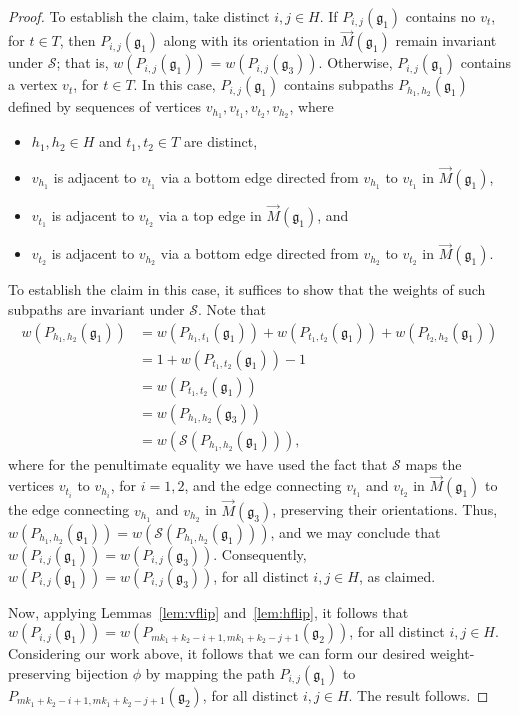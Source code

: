 \documentclass[letterpaper,10pt]{article}
\begin{document}
\begin{proof}
To establish the claim, take distinct $i,j\in H$. 
If $P_{i,j}(\mathfrak{g}_1)$ contains no $v_{t}$, for $t\in T$, then $P_{i,j}(\mathfrak{g}_1)$ along with its orientation in $\overrightarrow{M}(\mathfrak{g}_1)$ remain invariant under $\mathcal{S}$; that is, $w(P_{i,j}(\mathfrak{g}_1))=w(P_{i,j}(\mathfrak{g}_3))$. Otherwise, $P_{i,j}(\mathfrak{g}_1)$ contains a vertex $v_{t}$, for $t\in T$. In this case, $P_{i,j}(\mathfrak{g}_1)$ contains subpaths $P_{h_1,h_2}(\mathfrak{g}_1)$ defined by sequences of vertices $v_{h_1},v_{t_1},v_{t_2},v_{h_2}$, where
\begin{itemize}
    \item $h_1,h_2\in H$ and $t_1,t_2\in T$ are distinct,
    \item $v_{h_1}$ is adjacent to $v_{t_1}$ via a bottom edge directed from $v_{h_1}$ to $v_{t_1}$ in $\overrightarrow{M}(\mathfrak{g}_1)$,
    \item $v_{t_1}$ is adjacent to $v_{t_2}$ via a top edge in $\overrightarrow{M}(\mathfrak{g}_1)$, and
    \item $v_{t_2}$ is adjacent to $v_{h_2}$ via a bottom edge directed from $v_{h_2}$ to $v_{t_2}$ in $\overrightarrow{M}(\mathfrak{g}_1)$.
\end{itemize}
To establish the claim in this case, it suffices to show that the weights of such subpaths are invariant under $\mathcal{S}$. Note that
\begin{align*}
    w(P_{h_1,h_2}(\mathfrak{g}_1))&=w(P_{h_1,t_1}(\mathfrak{g}_1))+w(P_{t_1,t_2}(\mathfrak{g}_1))+w(P_{t_2,h_2}(\mathfrak{g}_1))\\
    &=1+w(P_{t_1,t_2}(\mathfrak{g}_1))-1\\
    &=w(P_{t_1,t_2}(\mathfrak{g}_1))\\
    &=w(P_{h_1,h_2}(\mathfrak{g}_3))\\
    &=w(\mathcal{S}(P_{h_1,h_2}(\mathfrak{g}_1))),
\end{align*}
where for the penultimate equality we have used the fact that $\mathcal{S}$ maps the vertices $v_{t_i}$ to $v_{h_i}$, for $i=1,2$, and the edge connecting $v_{t_1}$ and $v_{t_2}$ in $\overrightarrow{M}(\mathfrak{g}_1)$ to the edge connecting $v_{h_1}$ and $v_{h_2}$ in $\overrightarrow{M}(\mathfrak{g}_3)$, preserving their orientations. Thus, $w(P_{h_1,h_2}(\mathfrak{g}_1))=w(\mathcal{S}(P_{h_1,h_2}(\mathfrak{g}_1)))$, and we may conclude that $w(P_{i,j}(\mathfrak{g}_1))=w(P_{i,j}(\mathfrak{g}_3))$. Consequently, $w(P_{i,j}(\mathfrak{g}_1))=w(P_{i,j}(\mathfrak{g}_3))$, for all distinct $i,j\in H$, as claimed.

Now, applying Lemmas~\ref{lem:vflip} and~\ref{lem:hflip}, it follows that $w(P_{i,j}(\mathfrak{g}_1))=w(P_{mk_1+k_2-i+1,mk_1+k_2-j+1}(\mathfrak{g}_2))$, for all distinct $i,j\in H$. Considering our work above, it follows that we can form our desired weight-preserving bijection $\phi$ by mapping the path $P_{i,j}(\mathfrak{g}_1)$ to $P_{mk_1+k_2-i+1,mk_1+k_2-j+1}(\mathfrak{g}_2)$, for all distinct $i,j\in H$. The result follows.
\end{proof}
\end{document}
